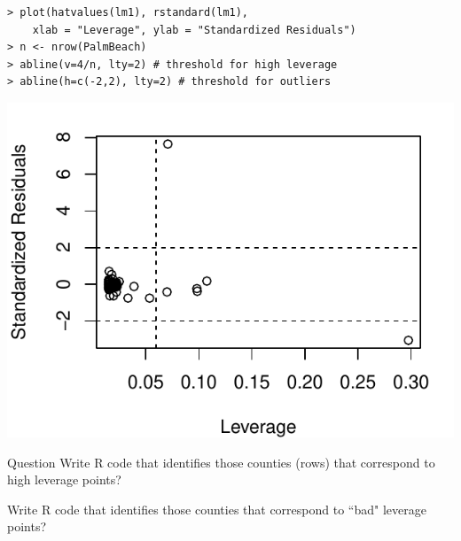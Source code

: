 \documentclass[10pt]{beamer}
\begin{document}
\begin{frame}[fragile]
\begin{verbatim}
> plot(hatvalues(lm1), rstandard(lm1), 
    xlab = "Leverage", ylab = "Standardized Residuals")
> n <- nrow(PalmBeach)
> abline(v=4/n, lty=2) # threshold for high leverage
> abline(h=c(-2,2), lty=2) # threshold for outliers
\end{verbatim}
\begin{center}
\includegraphics[scale=0.6]{figure/election_leverage.pdf}
\end{center}
\end{frame}


\begin{frame}{Question}
\vspace{-2cm}
Write R code that identifies those counties (rows) that correspond to high leverage points?\\
\vspace{3cm}

Write R code that identifies those counties that correspond to ``bad" leverage points?\\
\end{frame}
\end{document}
